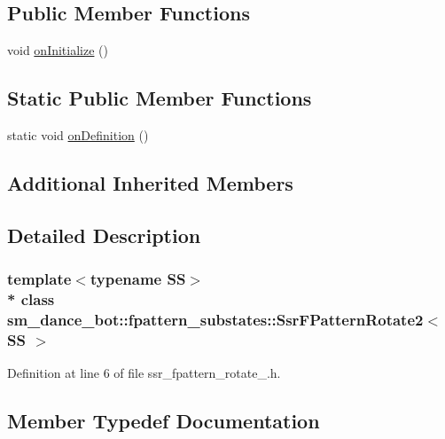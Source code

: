 \subsection*{Public Member Functions}
\begin{DoxyCompactItemize}
\item 
void \hyperlink{structsm__dance__bot_1_1fpattern__substates_1_1SsrFPatternRotate2_a30d20f24a7053c9bb70a770f615c6c00}{on\+Initialize} ()
\end{DoxyCompactItemize}
\subsection*{Static Public Member Functions}
\begin{DoxyCompactItemize}
\item 
static void \hyperlink{structsm__dance__bot_1_1fpattern__substates_1_1SsrFPatternRotate2_ab231649ce03471dce2523d523921a114}{on\+Definition} ()
\end{DoxyCompactItemize}
\subsection*{Additional Inherited Members}


\subsection{Detailed Description}
\subsubsection*{template$<$typename SS$>$\\*
class sm\+\_\+dance\+\_\+bot\+::fpattern\+\_\+substates\+::\+Ssr\+F\+Pattern\+Rotate2$<$ S\+S $>$}



Definition at line 6 of file ssr\+\_\+fpattern\+\_\+rotate\+\_.\+h.



\subsection{Member Typedef Documentation}
